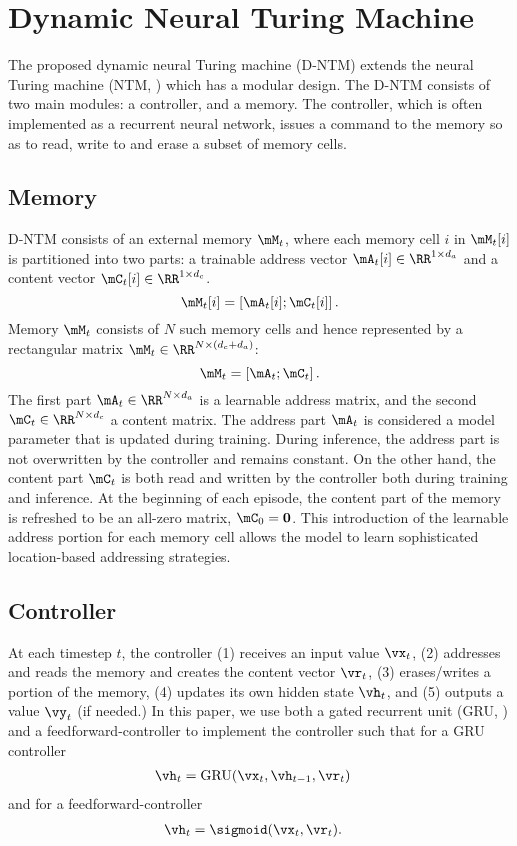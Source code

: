 \documentclass[12pt]{article}
\begin{document}
\section{Dynamic Neural Turing Machine}

The proposed dynamic neural Turing machine (D-NTM) extends the neural Turing
machine (NTM, \citep{graves2014neural}) which has a modular design. The D-NTM
consists of two main modules: a controller, and a memory. The controller, which is
often implemented as a recurrent neural network, issues a command to the memory
so as to read, write to and erase a subset of memory cells. 

\subsection{Memory}

D-NTM consists of an external memory $\mM_t$, where each memory cell $i$ in $\mM_t[i]$ is partitioned into two parts: a trainable address vector $\mA_t[i] \in \RR^{1 \times d_a}$ and a content vector $\mC_t[i] \in \RR^{1 \times d_c}$.
\[
    \mM_t[i] = \left[ \mA_t[i] ; \mC_t[i] \right].
\]
Memory $\mM_t$ consists of $N$ such memory cells and hence represented by a rectangular matrix $\mM_t \in \RR^{N \times (d_c + d_a)}$:
\[
    \mM_t = \left[ \mA_t ; \mC_t \right].
\]
The first part $\mA_t \in \RR^{N \times d_a}$ is a learnable address matrix, and the second $\mC_t \in \RR^{N \times d_c}$ a content matrix. The address part $\mA_t$ is considered a model parameter that is updated during
training. During inference, the address part is not overwritten by the
controller and remains constant. On the other hand, the content part $\mC_t$ is
both read and written by the controller both during training and inference. At
the beginning of each episode, the content part of the memory is refreshed to be an
all-zero matrix, $\mC_0= \mathbf{0}$. This introduction of the learnable address portion for each memory cell allows the model to learn sophisticated location-based addressing strategies. 

\subsection{Controller}

At each timestep $t$, the controller (1) receives an input value $\vx_t$, (2)
addresses and reads the memory and creates the content vector $\vr_t$, (3) erases/writes a
portion of the memory, (4) updates its own hidden state $\vh_t$, and (5) outputs
a value $\vy_t$ (if needed.) In this paper, we use both a gated recurrent unit (GRU,
\citep{cho2014learning}) and a feedforward-controller to implement the controller such that for a GRU controller
\begin{align}
    \vh_t &= \text{GRU}(\vx_t, \vh_{t-1}, \vr_t) 
\end{align}
and for a feedforward-controller
\begin{align}
    \vh_t &= \sigmoid(\vx_t, \vr_t).
\end{align}
\end{document}
